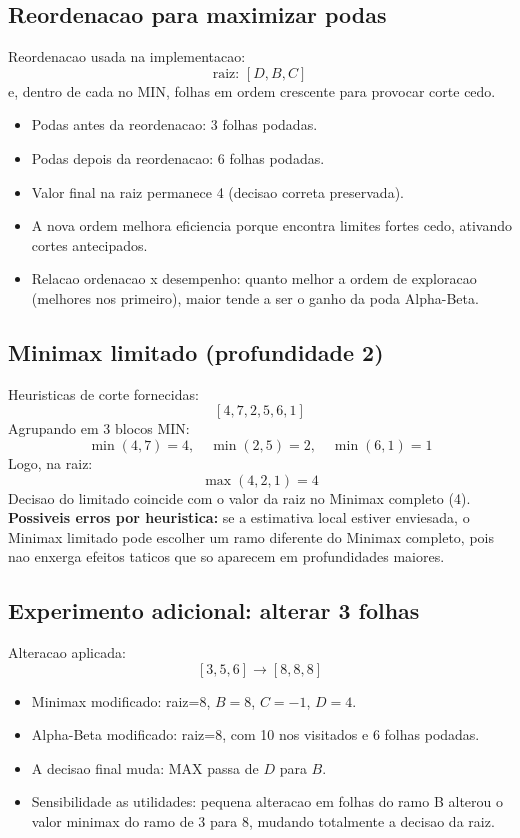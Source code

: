 \subsection{Reordenacao para maximizar podas}
Reordenacao usada na implementacao:
\[
\text{raiz: } [D,B,C]
\]
e, dentro de cada no MIN, folhas em ordem crescente para provocar corte cedo.

\begin{itemize}[leftmargin=1.5em]
  \item Podas antes da reordenacao: 3 folhas podadas.
  \item Podas depois da reordenacao: 6 folhas podadas.
  \item Valor final na raiz permanece 4 (decisao correta preservada).
  \item A nova ordem melhora eficiencia porque encontra limites fortes cedo, ativando cortes antecipados.
  \item Relacao ordenacao x desempenho: quanto melhor a ordem de exploracao (melhores nos primeiro), maior tende a ser o ganho da poda Alpha-Beta.
\end{itemize}

\subsection{Minimax limitado (profundidade 2)}
Heuristicas de corte fornecidas:
\[
[4,7,2,5,6,1]
\]
Agrupando em 3 blocos MIN:
\[
\min(4,7)=4,\quad \min(2,5)=2,\quad \min(6,1)=1
\]
Logo, na raiz:
\[
\max(4,2,1)=4
\]
Decisao do limitado coincide com o valor da raiz no Minimax completo (4).
\textbf{Possiveis erros por heuristica:} se a estimativa local estiver enviesada, o Minimax limitado pode escolher um ramo diferente do Minimax completo, pois nao enxerga efeitos taticos que so aparecem em profundidades maiores.

\subsection{Experimento adicional: alterar 3 folhas}
Alteracao aplicada:
\[
[3,5,6] \rightarrow [8,8,8]
\]

\begin{itemize}[leftmargin=1.5em]
  \item Minimax modificado: raiz=8, $B=8$, $C=-1$, $D=4$.
  \item Alpha-Beta modificado: raiz=8, com 10 nos visitados e 6 folhas podadas.
  \item A decisao final muda: MAX passa de $D$ para $B$.
  \item Sensibilidade as utilidades: pequena alteracao em folhas do ramo B alterou o valor minimax do ramo de 3 para 8, mudando totalmente a decisao da raiz.
\end{itemize}

